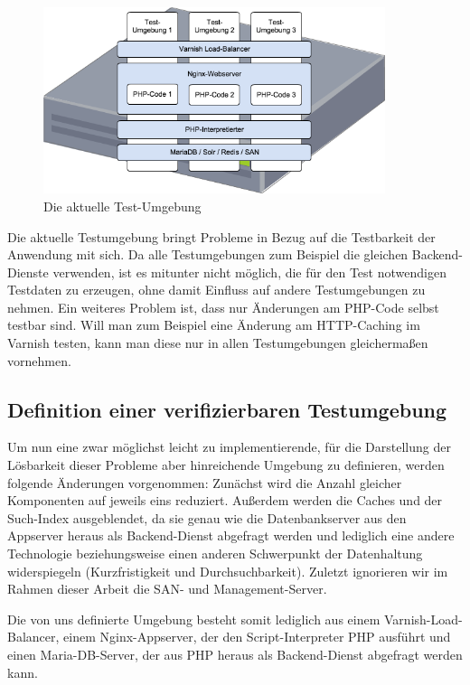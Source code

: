 \begin{figure}[!ht]
  \begin{center}
    \includegraphics[width=10cm]{bilder/Aktuelle-Testumgebung.png}
    \caption{Die aktuelle Test-Umgebung}
  \end{center}
\end{figure}

Die aktuelle Testumgebung bringt Probleme in Bezug auf die Testbarkeit der Anwendung mit sich. Da alle Testumgebungen zum Beispiel die gleichen Backend-Dienste verwenden, ist es mitunter nicht möglich, die für den Test notwendigen Testdaten zu erzeugen, ohne damit Einfluss auf andere Testumgebungen zu nehmen. Ein weiteres Problem ist, dass nur Änderungen am PHP-Code selbst testbar sind. Will man zum Beispiel eine Änderung am HTTP-Caching im Varnish testen, kann man diese nur in allen Testumgebungen gleichermaßen vornehmen.

\subsection{Definition einer verifizierbaren Testumgebung}

Um nun eine zwar möglichst leicht zu implementierende, für die Darstellung der Lösbarkeit dieser Probleme aber hinreichende Umgebung zu definieren, werden folgende Änderungen vorgenommen:
Zunächst wird die Anzahl gleicher Komponenten auf jeweils eins reduziert. Außerdem werden die Caches und der Such-Index ausgeblendet, da sie genau wie die Datenbankserver aus den Appserver heraus als Backend-Dienst abgefragt werden und lediglich eine andere Technologie beziehungsweise einen anderen Schwerpunkt der Datenhaltung widerspiegeln (Kurzfristigkeit und Durchsuchbarkeit). Zuletzt ignorieren wir im Rahmen dieser Arbeit die SAN- und Management-Server.

Die von uns definierte Umgebung besteht somit lediglich aus einem Varnish-Load-Balancer, einem Nginx-Appserver, der den Script-Interpreter PHP ausführt und einen Maria-DB-Server, der aus PHP heraus als Backend-Dienst abgefragt werden kann.

